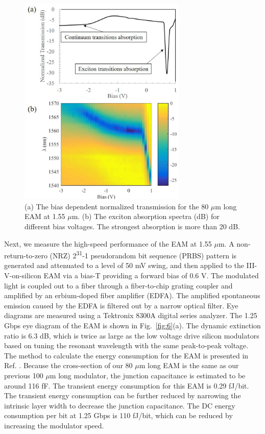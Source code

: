 \documentclass[aip,apl,reprint,a4paper]{revtex4-1}
\def\SP#1{\textsuperscript{#1}}
\begin{document}
\begin{figure}
	\includegraphics[width=8cm]{figure/fig5.eps}%
	\caption{\label{fig:5} (a) The bias dependent normalized transmission for the 80 $\mu$m long EAM at 1.55 $\mu$m. (b) The exciton absorption spectra (dB) for different bias voltages. The strongest absorption is more than 20 dB.}
\end{figure}

Next, we measure the high-speed performance of the EAM at 1.55 $\mu$m. A non-return-to-zero (NRZ)  2\SP{31}-1 pseudorandom bit sequence (PRBS) pattern is generated and  attenuated  to  a  level  of  50 mV  swing,  and then  applied  to  the III-V-on-silicon EAM via a bias-T providing a forward bias of 0.6 V. The modulated light is coupled out to a fiber through a fiber-to-chip grating coupler and amplified by an erbium-doped fiber amplifier (EDFA). The amplified spontaneous emission caused by the EDFA is filtered out by a narrow optical filter. Eye diagrams are measured using a Tektronix 8300A digital series analyzer. The 1.25 Gbps eye diagram of the EAM is shown in Fig.~\ref{fig:6}(a). The dynamic extinction ratio is 6.3 dB, which is twice as large as the low voltage drive silicon modulators based on tuning the resonant wavelength with the same peak-to-peak voltage.\cite{Shakoor:14} The method to calculate the energy consumption for the EAM is presented in Ref. . Because the cross-section of our 80 $\mu$m long EAM is the same as our previous 100 $\mu$m long modulator,\cite{fu52015} the junction capacitance is estimated to be around 116 fF. The transient energy consumption for this EAM is 0.29 fJ/bit. The transient energy consumption can be further reduced by narrowing the intrinsic layer width to decrease the junction capacitance. The DC energy consumption per bit at 1.25 Gbps is 110 fJ/bit, which can be reduced by increasing the modulator speed.
\end{document}
